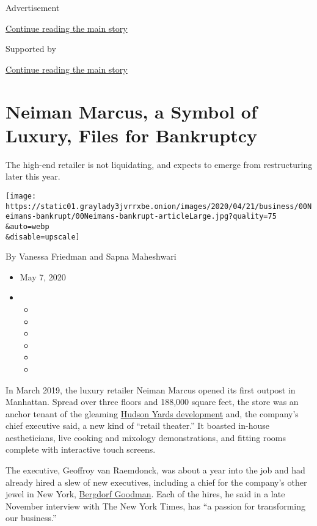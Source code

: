 Advertisement

\protect\hyperlink{after-top}{Continue reading the main story}

Supported by

\protect\hyperlink{after-sponsor}{Continue reading the main story}

\hypertarget{neiman-marcus-a-symbol-of-luxury-files-for-bankruptcy}{%
\section{Neiman Marcus, a Symbol of Luxury, Files for
Bankruptcy}\label{neiman-marcus-a-symbol-of-luxury-files-for-bankruptcy}}

The high-end retailer is not liquidating, and expects to emerge from
restructuring later this year.

\texttt{[image: https://static01.graylady3jvrrxbe.onion/images/2020/04/21/business/00Neimans-bankrupt/00Neimans-bankrupt-articleLarge.jpg?quality=75\\\&auto=webp\\\&disable=upscale]}

By Vanessa Friedman and Sapna Maheshwari

\begin{itemize}
\item
  May 7, 2020
\item
  \begin{itemize}
  \item
  \item
  \item
  \item
  \item
  \item
  \end{itemize}
\end{itemize}

In March 2019, the luxury retailer Neiman Marcus opened its first
outpost in Manhattan. Spread over three floors and 188,000 square feet,
the store was an anchor tenant of the gleaming
\href{https://www.nytimes3xbfgragh.onion/2019/04/10/style/hudson-yards-critical-shopper.html}{Hudson
Yards development} and, the company's chief executive said, a new kind
of ``retail theater.'' It boasted in-house aestheticians, live cooking
and mixology demonstrations, and fitting rooms complete with interactive
touch screens.

The executive, Geoffroy van Raemdonck, was about a year into the job and
had already hired a slew of new executives, including a chief for the
company's other jewel in New York,
\href{https://www.nytimes3xbfgragh.onion/2019/12/12/style/bergdorf-goodman-darcy-penick.html}{Bergdorf
Goodman}. Each of the hires, he said in a late November interview with
The New York Times, has ``a passion for transforming our business.''

